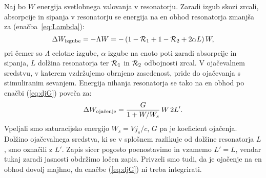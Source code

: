 Naj bo $W$ energija svetlobnega valovanja v resonatorju. Zaradi izgub skozi
zrcali, absorpcije in sipanja v resonatorju se energija na en obhod 
resonatorja zmanjša za (enačba~\ref{eq:Lambda}):
\begin{equation}
\Delta W_{\rm izgube}=-\Lambda W=-\left(1-{\cal {R}}_{1}+1-{\cal {R}}_{2}
+2\alpha L\right)W,
\label{5.1}
\end{equation}
pri čemer so $\Lambda $ celotne izgube, $\alpha$ izgube na enoto poti zaradi
absorpcije in sipanja, $L$ dolžina resonatorja ter 
${\cal {R}}_{1}$ in ${\cal {R}}_{2}$ odbojnosti
zrcal. V ojačevalnem sredstvu, v katerem vzdržujemo obrnjeno zasedenost,
pride do ojačevanja s stimuliranim sevanjem. Energija nihanja resonatorja 
se tako na en obhod po enačbi (\ref{eq:djG}) poveča za:
\begin{equation}  
\Delta W_{\rm oja\check{c}enje}=\frac{G}{1+W/W_s}\,W\, 2L'.
\label{5.2}
\end{equation}
Vpeljali smo saturacijsko energijo $W_s=Vj_s/c$, $G$ pa je koeficient ojačenja.
Dolžino ojačevalnega sredstva,
ki se v splošnem razlikuje od dolžine resonatorja $L$, smo označili z $L'$.
Zapis sicer pogosto poenostavimo in vzamemo $L'=L$, vendar tukaj zaradi
jasnosti obdržimo ločen zapis. Privzeli smo tudi, da je ojačenje na en
obhod dovolj majhno, da enačbe (\ref{eq:djG}) ni treba integrirati.

